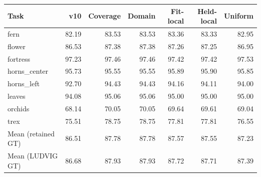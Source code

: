 \begin{tabular}{lrrrrrr}
\toprule
Task & v10 & Coverage & Domain & Fit-local & Held-local & Uniform \\
\midrule
fern & 82.19 & 83.53 & 83.53 & 83.36 & 83.33 & 82.95 \\
flower & 86.53 & 87.38 & 87.38 & 87.26 & 87.25 & 86.95 \\
fortress & 97.23 & 97.46 & 97.46 & 97.42 & 97.42 & 97.53 \\
horns\_center & 95.73 & 95.55 & 95.55 & 95.89 & 95.90 & 95.85 \\
horns\_left & 92.70 & 94.43 & 94.43 & 94.16 & 94.11 & 94.00 \\
leaves & 94.08 & 95.06 & 95.06 & 95.00 & 95.00 & 95.00 \\
orchids & 68.14 & 70.05 & 70.05 & 69.64 & 69.61 & 69.04 \\
trex & 75.51 & 78.75 & 78.75 & 77.81 & 77.81 & 76.55 \\
\midrule Mean (retained GT) & 86.51 & 87.78 & 87.78 & 87.57 & 87.55 & 87.23 \\
\midrule Mean (LUDVIG GT) & 86.68 & 87.93 & 87.93 & 87.72 & 87.71 & 87.39 \\
\bottomrule
\end{tabular}
